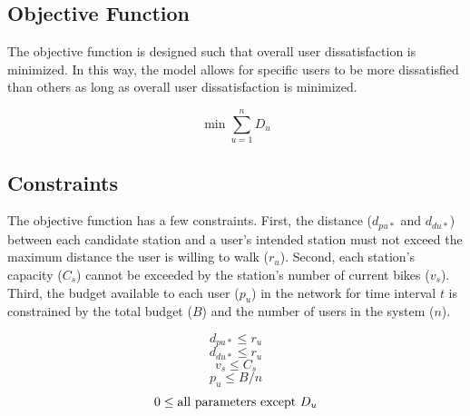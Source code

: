 \documentclass[times, 10pt,twocolumn]{article}
\begin{document}
\subsection{Objective Function}
 
 The objective function is designed such that overall user dissatisfaction is minimized. In this way, the model allows for specific users to be more dissatisfied than others as long as overall user dissatisfaction is minimized.

\begin{equation}
\min{\sum_{u=1}^{n}D_u}
\end{equation}

\subsection{Constraints}

The objective function has a few constraints. First, the distance ($d_{pu*}$ and $d_{du*}$) between each candidate station and a user's intended station must not exceed the maximum distance the user is willing to walk ($r_u$). Second, each station's capacity ($C_s$) cannot be exceeded by the station's number of current bikes ($v_s$). Third, the budget available to each user ($p_u$) in the network for time interval $t$ is constrained by the total budget ($B$) and the number of users in the system ($n$).

\begin{equation}
d_{pu*} \leq r_u
\end{equation}
\begin{equation}
d_{du*} \leq r_u
\end{equation}
\begin{equation}
v_s \leq C_s
\end{equation}
\begin{equation}
p_u \leq B/n
\end{equation}
\begin{equation}
0 \leq \textnormal{all parameters except } D_u
\end{equation}
\end{document}
